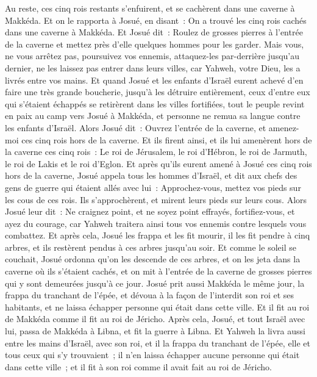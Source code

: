 \begin{multicols}{2}
Au reste, ces cinq rois restants s'enfuirent, et se cachèrent dans une caverne à Makkéda.
Et on le rapporta à Josué, en disant~: On a trouvé les cinq rois cachés dans une caverne à Makkéda.
Et Josué dit~: Roulez de grosses pierres à l'entrée de la caverne et mettez près d'elle quelques hommes pour les garder.
Mais vous, ne vous arrêtez pas, poursuivez vos ennemis, attaquez-les par-derrière jusqu'au dernier, ne les laissez pas entrer dans leurs villes, car Yahweh, votre Dieu, les a livrés entre vos mains.
Et quand Josué et les enfants d'Israël eurent achevé d'en faire une très grande boucherie, jusqu'à les détruire entièrement, ceux d'entre eux qui s'étaient échappés se retirèrent dans les villes fortifiées,
tout le peuple revint en paix au camp vers Josué à Makkéda, et personne ne remua sa langue contre les enfants d'Israël.
Alors Josué dit~: Ouvrez l'entrée de la caverne, et amenez-moi ces cinq rois hors de la caverne.
Et ils firent ainsi, et ils lui amenèrent hors de la caverne ces cinq rois~: Le roi de Jérusalem, le roi d'Hébron, le roi de Jarmuth, le roi de Lakis et le roi d'Eglon.
Et après qu'ils eurent amené à Josué ces cinq rois hors de la caverne, Josué appela tous les hommes d'Israël, et dit aux chefs des gens de guerre qui étaient allés avec lui~: Approchez-vous, mettez vos pieds sur les cous de ces rois. Ils s'approchèrent, et mirent leurs pieds sur leurs cous.
Alors Josué leur dit~: Ne craignez point, et ne soyez point effrayés, fortifiez-vous, et ayez du courage, car Yahweh traitera ainsi tous vos ennemis contre lesquels vous combattez.
Et après cela, Josué les frappa et les fit mourir, il les fit pendre à cinq arbres, et ils restèrent pendus à ces arbres jusqu'au soir.
Et comme le soleil se couchait, Josué ordonna qu'on les descende de ces arbres, et on les jeta dans la caverne où ils s'étaient cachés, et on mit à l'entrée de la caverne de grosses pierres qui y sont demeurées jusqu'à ce jour.
Josué prit aussi Makkéda le même jour, la frappa du tranchant de l'épée, et dévoua à la façon de l'interdit son roi et ses habitants, et ne laissa échapper personne qui était dans cette ville. Et il fit au roi de Makkéda comme il fit au roi de Jéricho.
Après cela, Josué, et tout Israël avec lui, passa de Makkéda à Libna, et fit la guerre à Libna.
Et Yahweh la livra aussi entre les mains d'Israël, avec son roi, et il la frappa du tranchant de l'épée, elle et tous ceux qui s'y trouvaient~; il n'en laissa échapper aucune personne qui était dans cette ville~; et il fit à son roi comme il avait fait au roi de Jéricho.

\end{multicols}
